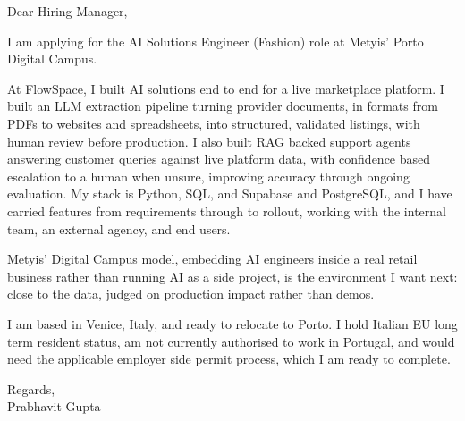 \documentclass[a4paper,11pt]{article}
\begin{document}
Dear Hiring Manager,

I am applying for the AI Solutions Engineer (Fashion) role at Metyis' Porto Digital Campus.

At FlowSpace, I built AI solutions end to end for a live marketplace platform. I built an LLM extraction pipeline turning provider documents, in formats from PDFs to websites and spreadsheets, into structured, validated listings, with human review before production. I also built RAG backed support agents answering customer queries against live platform data, with confidence based escalation to a human when unsure, improving accuracy through ongoing evaluation. My stack is Python, SQL, and Supabase and PostgreSQL, and I have carried features from requirements through to rollout, working with the internal team, an external agency, and end users.

Metyis' Digital Campus model, embedding AI engineers inside a real retail business rather than running AI as a side project, is the environment I want next: close to the data, judged on production impact rather than demos.

I am based in Venice, Italy, and ready to relocate to Porto. I hold Italian EU long term resident status, am not currently authorised to work in Portugal, and would need the applicable employer side permit process, which I am ready to complete.

Regards,\\
Prabhavit Gupta
\end{document}
